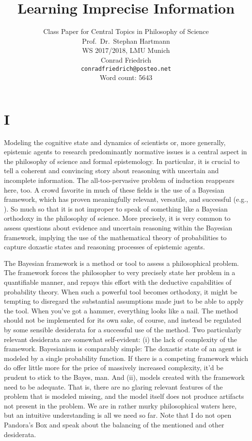 \documentclass[11pt, a4paper]{scrartcl}
\title{\osfamily{}Learning Imprecise Information}
\author{Class Paper for Central Topics in Philosophy of Science \\ Prof.\ Dr.\ Stephan Hartmann \\ WS 2017/2018, LMU Munich \\ Conrad Friedrich \\ \texttt{conradfriedrich@posteo.net} \\ Word count: 5643}
\begin{document}
\maketitle
\thispagestyle{empty}
\newpage
\section{I}
Modeling the cognitive state and dynamics of scientists or, more generally, epistemic agents to research predominantly normative issues is a central aspect in the philosophy of science and formal epistemology. In particular, it is crucial to tell a coherent and convincing story about reasoning with uncertain and incomplete information. The all-too-pervasive problem of induction reappears here, too. A crowd favorite in much of these fields is the use of a Bayesian framework, which has proven meaningfully relevant, versatile, and successful (e.g.\citet{Bovens2003-HARBE}, \citet{Hartmann2017}). So much so that it is not improper to speak of something like a Bayesian orthodoxy in the philosophy of science. More precisely, it is very common to assess questions about evidence and uncertain reasoning within the Bayesian framework, implying the use of the mathematical theory of probabilities to capture doxastic states and reasoning processes of epistemic agents.

The Bayesian framework is a method or tool to assess a philosophical problem. The framework forces the philosopher to very precisely state her problem in a quantifiable manner, and repays this effort with the deductive capabilities of probability theory. When such a powerful tool becomes orthodoxy, it might be tempting to disregard the substantial assumptions made just to be able to apply the tool. When you've got a hammer, everything looks like a nail. The method should not be implemented for its own sake, of course, and instead be regulated by some sensible desiderata for a successful use of the method. Two particularly relevant desiderata are somewhat self-evident: (i) the lack of complexity of the framework. Bayesianism is comparably simple: The doxastic state of an agent is modeled by a single probability function. If there is a competing framework which do offer little more for the price of massively increased complexity, it'd be prudent to stick to the Bayes, man. And (ii), models created with the framework need to be adequate. That is, there are no glaring relevant features of the problem that is modeled missing, and the model itself does not produce artifacts not present in the problem. We are in rather murky philosophical waters here, but an intuitive understanding is all we need so far. Note that I do not open Pandora's Box and speak about the balancing of the mentioned and other desiderata.
\end{document}
